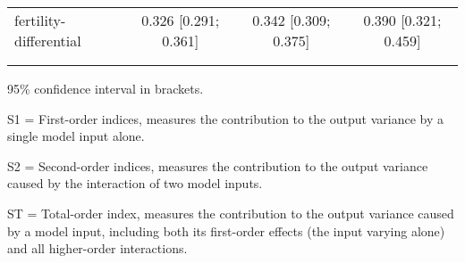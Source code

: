\begin{table}[htp]
\begin{threeparttable}
\begin{tabular}{lccc}
	  \hspace{1.5em} fertility-differential & 0.326 [0.291; 0.361]   & 0.342 [0.309; 0.375]   & 0.390 [0.321; 0.459] \\
	 \\
    \addlinespace
    \hline
    \end{tabular}
    \begin{tablenotes}
    \scriptsize
    \item 95\% confidence interval in brackets.
    \item S1 = First-order indices,  measures the contribution to the output variance by a single model input alone.
    \item S2 = Second-order indices,  measures the contribution to the output variance caused by the interaction of two model inputs.
    \item ST = Total-order index, measures the contribution to the output variance caused by a model input, including both its first-order effects (the input varying alone) and all higher-order interactions.
    \end{tablenotes}
    \end{threeparttable}
    \end{table}